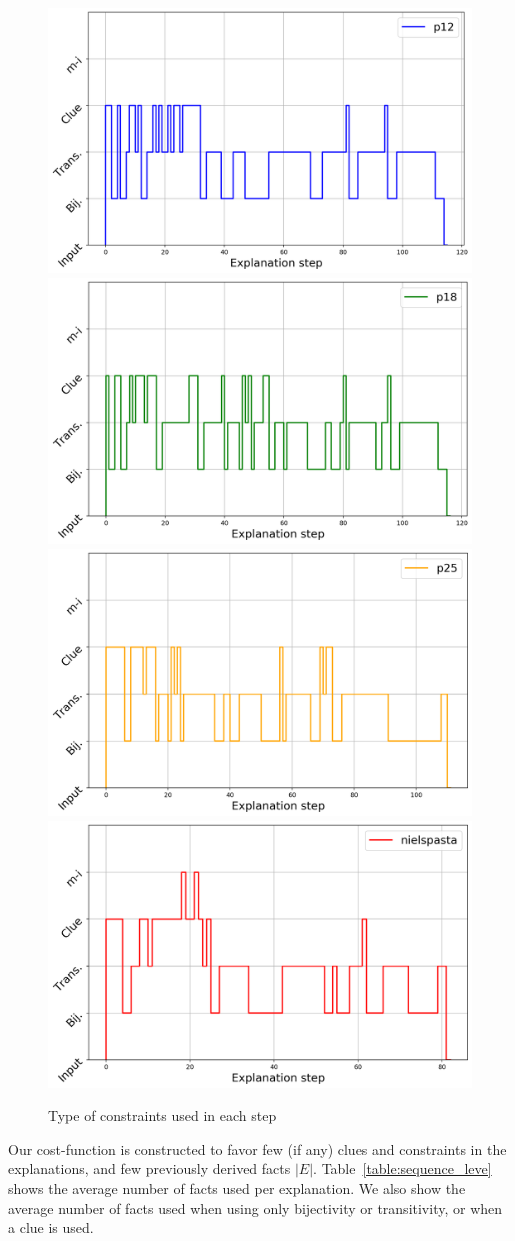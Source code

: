 \begin{figure}[t]
\centering
\includegraphics[width=0.49\linewidth]{figures/plot_cost_steps_p12}
\includegraphics[width=0.49\linewidth]{figures/plot_cost_steps_p18}
\includegraphics[width=0.49\linewidth]{figures/plot_cost_steps_p25}
\includegraphics[width=0.49\linewidth]{figures/plot_cost_steps_nielspasta}
\caption{Type of constraints used in each step}
\label{fig:steps}
\end{figure}

Our cost-function is constructed to favor few (if any) clues and constraints in the explanations, and few previously derived facts $|E|$. Table~\ref{table:sequence_leve} shows the average number of facts used per explanation. We also show the average number of facts used when using only bijectivity or transitivity, or when a clue is used.

